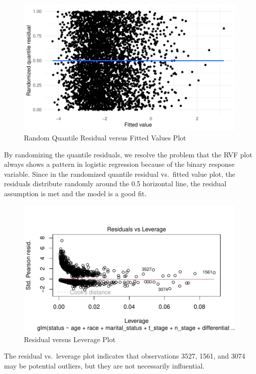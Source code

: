 \documentclass[
]{article}
\begin{document}
\begin{figure}
\includegraphics[width=0.9\linewidth]{Appendix_files/figure-latex/unnamed-chunk-6-1} \caption{Random Quantile Residual versus Fitted Values Plot}\label{fig:unnamed-chunk-6}
\end{figure}

By randomizing the quantile residuals, we resolve the problem that the
RVF plot always shows a pattern in logistic regression because of the
binary response variable. Since in the randomized quantile residual
vs.~fitted value plot, the residuals distribute randomly around the 0.5
horizontal line, the residual assumption is met and the model is a good
fit.

\begin{figure}
\includegraphics[width=0.9\linewidth]{Appendix_files/figure-latex/unnamed-chunk-7-1} \caption{Residual versus Leverage Plot}\label{fig:unnamed-chunk-7}
\end{figure}

The residual vs.~leverage plot indicates that observations 3527, 1561,
and 3074 may be potential outliers, but they are not necessarily
influential.
\end{document}
